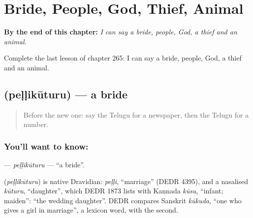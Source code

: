 
\chapter{Bride, People, God, Thief, Animal}
\label{ch:te-bride-people-god-thief-animal}

\begin{chapteropening}
\textbf{By the end of this chapter:} \emph{I can say a bride, people, God, a thief and an animal.}

Complete the last lesson of chapter 265: I can say a bride, people, God, a thief and an animal.
\end{chapteropening}

\section[\texorpdfstring{\te{పెళ్ళికూతురు} (peḷḷikūturu)}{పెళ్ళికూతురు (peḷḷikūturu)}]{ (peḷḷikūturu) — a bride}

\label{lesson:TE-C265-pellikuturu}



\begin{quote}
Before the new one: say the Telugu for a newspaper, then the Telugu for a number.
\end{quote}

\subsection*{You'll want to know: }
\textbf{} — \emph{peḷḷikūturu} — \textquotedblleft{}a bride\textquotedblright{}.

\begin{cousinweb}
\textbf{} (\emph{peḷḷikūturu}) is native Dravidian: \emph{peḷḷi}, \textquotedblleft{}marriage\textquotedblright{} (DEDR 4395), and a nasalised \emph{kūturu}, \textquotedblleft{}daughter\textquotedblright{}, which DEDR 1873 lists with Kannada \emph{kūsu}, \textquotedblleft{}infant; maiden\textquotedblright{}: \textquotedblleft{}the wedding daughter\textquotedblright{}. DEDR compares Sanskrit \emph{kūkuda}, \textquotedblleft{}one who gives a girl in marriage\textquotedblright{}, a lexicon word, with the second.
\end{cousinweb}

